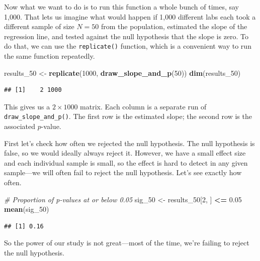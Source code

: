 \documentclass[
  12pt,
  oneside,openany]{book}
\newenvironment{Shaded}{\begin{snugshade}}{\end{snugshade}}
\newcommand{\CommentTok}[1]{\textcolor[rgb]{0.56,0.35,0.01}{\textit{#1}}}
\newcommand{\DecValTok}[1]{\textcolor[rgb]{0.00,0.00,0.81}{#1}}
\newcommand{\FloatTok}[1]{\textcolor[rgb]{0.00,0.00,0.81}{#1}}
\newcommand{\KeywordTok}[1]{\textcolor[rgb]{0.13,0.29,0.53}{\textbf{#1}}}
\newcommand{\NormalTok}[1]{#1}
\newcommand{\OperatorTok}[1]{\textcolor[rgb]{0.81,0.36,0.00}{\textbf{#1}}}
\newcommand{\StringTok}[1]{\textcolor[rgb]{0.31,0.60,0.02}{#1}}
\begin{document}
Now what we want to do is to run this function a whole bunch of times, say 1,000. That lets us imagine what would happen if 1,000 different labs each took a different sample of size \(N = 50\) from the population, estimated the slope of the regression line, and tested against the null hypothesis that the slope is zero. To do that, we can use the \texttt{replicate()} function, which is a convenient way to run the same function repeatedly.

\begin{Shaded}
\begin{Highlighting}[]
\NormalTok{results\_}\DecValTok{50}\NormalTok{ <{-}}\StringTok{ }\KeywordTok{replicate}\NormalTok{(}\DecValTok{1000}\NormalTok{, }\KeywordTok{draw\_slope\_and\_p}\NormalTok{(}\DecValTok{50}\NormalTok{))}
\KeywordTok{dim}\NormalTok{(results\_}\DecValTok{50}\NormalTok{)}
\end{Highlighting}
\end{Shaded}

\begin{verbatim}
## [1]    2 1000
\end{verbatim}

This gives us a \(2 \times 1000\) matrix. Each column is a separate run of \texttt{draw\_slope\_and\_p()}. The first row is the estimated slope; the second row is the associated \(p\)-value.

First let's check how often we rejected the null hypothesis. The null hypothesis is false, so we would ideally always reject it. However, we have a small effect size and each individual sample is small, so the effect is hard to detect in any given sample---we will often fail to reject the null hypothesis. Let's see exactly how often.

\begin{Shaded}
\begin{Highlighting}[]
\CommentTok{\# Proportion of p{-}values at or below 0.05}
\NormalTok{sig\_}\DecValTok{50}\NormalTok{ <{-}}\StringTok{ }\NormalTok{results\_}\DecValTok{50}\NormalTok{[}\DecValTok{2}\NormalTok{, ] }\OperatorTok{<=}\StringTok{ }\FloatTok{0.05}
\KeywordTok{mean}\NormalTok{(sig\_}\DecValTok{50}\NormalTok{)}
\end{Highlighting}
\end{Shaded}

\begin{verbatim}
## [1] 0.16
\end{verbatim}

So the power of our study is not great---most of the time, we're failing to reject the null hypothesis.
\end{document}
